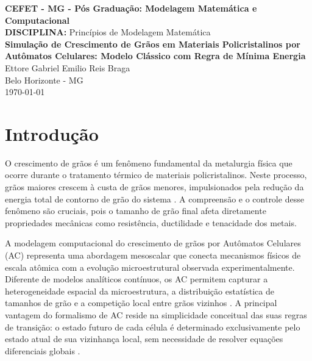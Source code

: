 \documentclass[12pt,a4paper]{article}
\begin{document}
\begin{titlepage}
    \begin{center}
        \large \textbf{CEFET - MG - Pós Graduação: Modelagem Matemática e Computacional} \\
        \vspace{1cm}
        \large \textbf{DISCIPLINA:} Princípios de Modelagem Matemática \\
        \vspace{4cm}
        \Large \textbf{Simulação de Crescimento de Grãos em Materiais Policristalinos
        por Autômatos Celulares: Modelo Clássico com Regra de Mínima Energia} \\
        \vspace{4cm}
        \large Ettore Gabriel Emilio Reis Braga \\
        \vfill
        \large Belo Horizonte - MG \\
        \large \today
    \end{center}
\end{titlepage}

\newpage

\section{Introdução}

O crescimento de grãos é um fenômeno fundamental da metalurgia física que ocorre durante
o tratamento térmico de materiais policristalinos. Neste processo, grãos maiores crescem
à custa de grãos menores, impulsionados pela redução da energia total de contorno de
grão do sistema \cite{humphreys2004}. A compreensão e o controle desse fenômeno são
cruciais, pois o tamanho de grão final afeta diretamente propriedades mecânicas como
resistência, ductilidade e tenacidade dos metais.

A modelagem computacional do crescimento de grãos por Autômatos Celulares (AC)
representa uma abordagem mesoscalar que conecta mecanismos físicos de escala atômica
com a evolução microestrutural observada experimentalmente. Diferente de modelos
analíticos contínuos, os AC permitem capturar a heterogeneidade espacial da
microestrutura, a distribuição estatística de tamanhos de grão e a competição local
entre grãos vizinhos \cite{raghavan2007}. A principal vantagem do formalismo de AC
reside na simplicidade conceitual das suas regras de transição: o estado futuro de cada
célula é determinado exclusivamente pelo estado atual de sua vizinhança local, sem
necessidade de resolver equações diferenciais globais \cite{janssens2010}.
\end{document}
